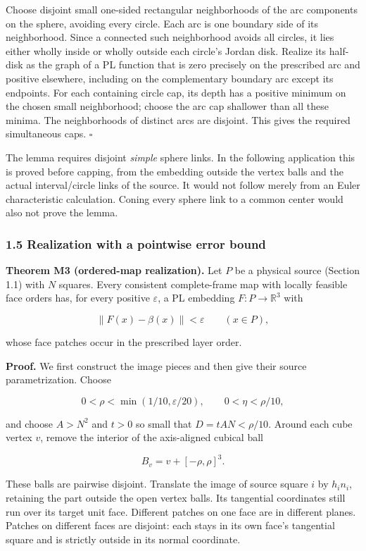 \documentclass[
  11pt,
]{article}
\begin{document}
Choose disjoint small one-sided rectangular neighborhoods of the arc
components on the sphere, avoiding every circle. Each arc is one
boundary side of its neighborhood. Since a connected such neighborhood
avoids all circles, it lies either wholly inside or wholly outside each
circle's Jordan disk. Realize its half-disk as the graph of a PL
function that is zero precisely on the prescribed arc and positive
elsewhere, including on the complementary boundary arc except its
endpoints. For each containing circle cap, its depth has a positive
minimum on the chosen small neighborhood; choose the arc cap shallower
than all these minima. The neighborhoods of distinct arcs are disjoint.
This gives the required simultaneous caps. \(\square\)

The lemma requires disjoint \emph{simple} sphere links. In the following
application this is proved before capping, from the embedding outside
the vertex balls and the actual interval/circle links of the source. It
would not follow merely from an Euler characteristic calculation. Coning
every sphere link to a common center would also not prove the lemma.

\subsubsection{1.5 Realization with a pointwise error
bound}\label{realization-with-a-pointwise-error-bound}

\textbf{Theorem M3 (ordered-map realization).} Let \(P\) be a physical
source (Section 1.1) with \(N\) squares. Every consistent complete-frame
map with locally feasible face orders has, for every positive
\(\varepsilon\), a PL embedding \(F:P\to\mathbb R^3\) with

\[
\lVert F(x)-\beta(x)\rVert<\varepsilon\qquad(x\in P),
\]

whose face patches occur in the prescribed layer order.

\textbf{Proof.} We first construct the image pieces and then give their
source parametrization. Choose

\[
0<\rho<\min(1/10,\varepsilon/20),\qquad
0<\eta<\rho/10,
\]

and choose \(A>N^2\) and \(t>0\) so small that \(D=tAN<\rho/10\). Around
each cube vertex \(v\), remove the interior of the axis-aligned cubical
ball

\[
B_v=v+[-\rho,\rho]^3.
\]

These balls are pairwise disjoint. Translate the image of source square
\(i\) by \(h_i n_i\), retaining the part outside the open vertex balls.
Its tangential coordinates still run over its target unit face.
Different patches on one face are in different planes. Patches on
different faces are disjoint: each stays in its own face's tangential
square and is strictly outside in its normal coordinate.
\end{document}
